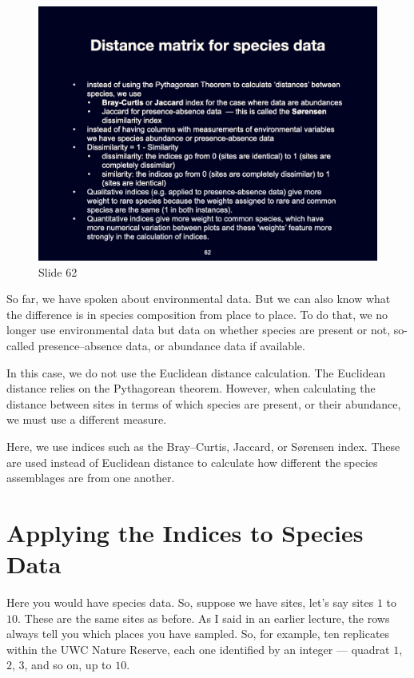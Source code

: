 \documentclass[
  12pt,
]{book}
\begin{document}
\begin{figure}[ht]
\centering
\includegraphics[width=0.8\linewidth]{../images/BDC334/BDC334-062.jpeg}
\caption*{Slide 62}
\end{figure}

So far, we have spoken about environmental data. But we can also know
what the difference is in species composition from place to place. To do
that, we no longer use environmental data but data on whether species
are present or not, so-called presence--absence data, or abundance data
if available.

In this case, we do not use the Euclidean distance calculation. The
Euclidean distance relies on the Pythagorean theorem. However, when
calculating the distance between sites in terms of which species are
present, or their abundance, we must use a different measure.

Here, we use indices such as the Bray--Curtis, Jaccard, or Sørensen
index. These are used instead of Euclidean distance to calculate how
different the species assemblages are from one another.

\section{Applying the Indices to Species
Data}\label{applying-the-indices-to-species-data}

Here you would have species data. So, suppose we have sites, let's say
sites \(1\) to \(10\). These are the same sites as before. As I said in
an earlier lecture, the rows always tell you which places you have
sampled. So, for example, ten replicates within the UWC Nature Reserve,
each one identified by an integer --- quadrat \(1\), \(2\), \(3\), and
so on, up to \(10\).
\end{document}
